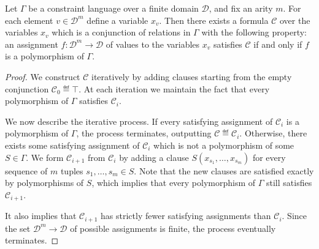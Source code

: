 \documentclass{article}
\newcommand*{\D}{\mathcal{D}}
\newcommand*{\CC}{\mathcal{C}}
\begin{document}
\begin{lemma}
  \label{lem:polyformula}
  Let $\Gamma$ be a constraint language over a finite domain $\D$, and fix an arity $m$.
  For each element $v \in \D^m$ define a variable $x_v$.
  Then there exists a formula $\CC$ over the variables $x_v$ which is a conjunction of relations in $\Gamma$ with the following property:
  an assignment $f : \D^m \to \D$ of values to the variables $x_v$
  satisfies $\CC$ if and only if $f$ is a polymorphism of $\Gamma$.
\end{lemma}
\begin{proof}
  We construct $\CC$ iteratively by adding clauses starting from the empty conjunction $\CC_0 \eqdef \top$.  At each iteration we maintain the fact that every polymorphism of $\Gamma$ satisfies $\CC_i$.

  We now describe the iterative process.
  If every satisfying assignment of $\CC_i$ is a polymorphism of $\Gamma$, the process terminates, outputting $\CC \eqdef \CC_i$.
  Otherwise, there exists some satisfying assignment of $\CC_i$ which is not a polymorphism of some $S \in \Gamma$.
  We form $\CC_{i+1}$ from $\CC_i$ by adding a clause $S(x_{s_1}, \dots, x_{s_m})$
  for every sequence of $m$ tuples $s_1, \dots, s_m \in S$.
  Note that the new clauses are satisfied exactly by polymorphisms of $S$, which implies that every polymorphism of $\Gamma$ still satisfies $\CC_{i+1}$.

  It also implies that $\CC_{i+1}$ has strictly fewer satisfying assignments than $\CC_i$.
  Since the set $\D^m \to \D$ of possible assignments is finite,
  the process eventually terminates.
\end{proof}
\end{document}
